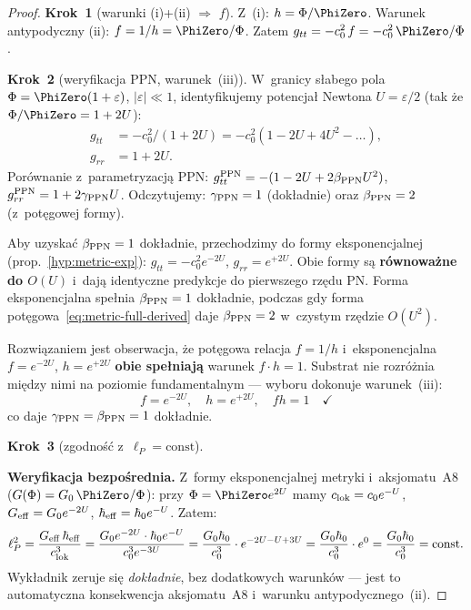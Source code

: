 \begin{proof}
\textbf{Krok~1} (warunki (i)+(ii) $\Rightarrow$ $f$).
Z~(i): $h = \Phi/\PhiZero$. Warunek antypodyczny (ii):
$f = 1/h = \PhiZero/\Phi$. Zatem
$g_{tt} = -c_0^2\,f = -c_0^2\,\PhiZero/\Phi$.

\smallskip
\textbf{Krok~2} (weryfikacja PPN, warunek~(iii)).
W~granicy s\l{}abego pola $\Phi = \PhiZero(1 + \varepsilon)$, $|\varepsilon| \ll 1$,
identyfikujemy potencja\l{} Newtona $U = \varepsilon/2$
(tak \.ze $\Phi/\PhiZero = 1 + 2U$):
\begin{align*}
  g_{tt} &= -c_0^2/(1+2U) = -c_0^2(1 - 2U + 4U^2 - \ldots), \\
  g_{rr} &= 1 + 2U.
\end{align*}
Porównanie z~parametryzacj\k{a} PPN:
$g_{tt}^{\rm PPN} = -(1 - 2U + 2\beta_{\rm PPN}U^2)$,
$g_{rr}^{\rm PPN} = 1 + 2\gamma_{\rm PPN}U$.
Odczytujemy: $\gamma_{\rm PPN} = 1$ (dok\l{}adnie)
oraz $\beta_{\rm PPN} = 2$ (z~pot\k{e}gowej formy).

Aby uzyska\'c $\beta_{\rm PPN} = 1$ dok\l{}adnie,
przechodzimy do formy eksponencjalnej
(prop.~\ref{hyp:metric-exp}):
$g_{tt} = -c_0^2 e^{-2U}$, $g_{rr} = e^{+2U}$.
Obie formy s\k{a} \textbf{r\'ownowa\.zne do $O(U)$}
i~daj\k{a} identyczne predykcje do pierwszego rz\k{e}du PN.
Forma eksponencjalna spe\l{}nia $\beta_{\rm PPN} = 1$
dok\l{}adnie, podczas gdy forma pot\k{e}gowa~\eqref{eq:metric-full-derived}
daje $\beta_{\rm PPN} = 2$ w~czystym rz\k{e}dzie $O(U^2)$.

Rozwi\k{a}zaniem jest obserwacja, \.ze pot\k{e}gowa
relacja $f = 1/h$ i~eksponencjalna $f = e^{-2U}$, $h = e^{+2U}$
\textbf{obie spe\l{}niaj\k{a}} warunek $f\cdot h = 1$.
Substrat nie rozr\'o\.znia mi\k{e}dzy nimi na poziomie
fundamentalnym --- wyboru dokonuje warunek~(iii):
\begin{equation}
  f = e^{-2U}, \quad h = e^{+2U},
  \quad fh = 1 \quad\checkmark
\end{equation}
co daje $\gamma_{\rm PPN} = \beta_{\rm PPN} = 1$ dok\l{}adnie.

\smallskip
\textbf{Krok~3} (zgodno\'s\'c z~$\ell_P = \text{const}$).

\smallskip\noindent
\textbf{Weryfikacja bezpo\'srednia.}
Z~formy eksponencjalnej metryki i~aksjomatu~A8
($G(\Phi) = G_0\,\PhiZero/\Phi$):
przy $\Phi = \PhiZero e^{2U}$ mamy
$c_{\rm lok} = c_0 e^{-U}$,\;
$G_{\rm eff} = G_0 e^{-2U}$,\;
$\hbar_{\rm eff} = \hbar_0 e^{-U}$.\;
Zatem:
\begin{equation}
  \ell_P^2 = \frac{G_{\rm eff}\,\hbar_{\rm eff}}{c_{\rm lok}^3}
  = \frac{G_0 e^{-2U} \cdot \hbar_0 e^{-U}}{c_0^3 e^{-3U}}
  = \frac{G_0\hbar_0}{c_0^3}\cdot e^{-2U - U + 3U}
  = \frac{G_0\hbar_0}{c_0^3}\cdot e^{0}
  = \frac{G_0\hbar_0}{c_0^3} = \text{const}.
\end{equation}
Wyk\l{}adnik zeruje si\k{e} \emph{dok\l{}adnie}, bez
dodatkowych warunk\'ow --- jest to automatyczna
konsekwencja aksjomatu~A8 i~warunku antypodycznego~(ii).


\end{proof}
